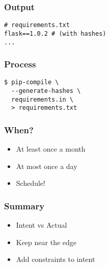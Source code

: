 \begin{frame}[fragile]
\frametitle{Output}

\begin{lstlisting}
# requirements.txt
flask==1.0.2 # (with hashes)
...
\end{lstlisting}
\end{frame}

\begin{frame}[fragile]
\frametitle{Process}

\begin{lstlisting}
$ pip-compile \
  --generate-hashes \
  requirements.in \
  > requirements.txt
\end{lstlisting}

\end{frame}

\begin{frame}[fragile]
\frametitle{When?}

\begin{itemize}
\item At least once a month
\item At most once a day
\item Schedule!
\end{itemize}

\end{frame}

\begin{frame}[fragile]
\frametitle{Summary}

\begin{itemize}
\item Intent vs Actual
\item Keep near the edge
\item Add constraints to intent
\end{itemize}

\end{frame}



